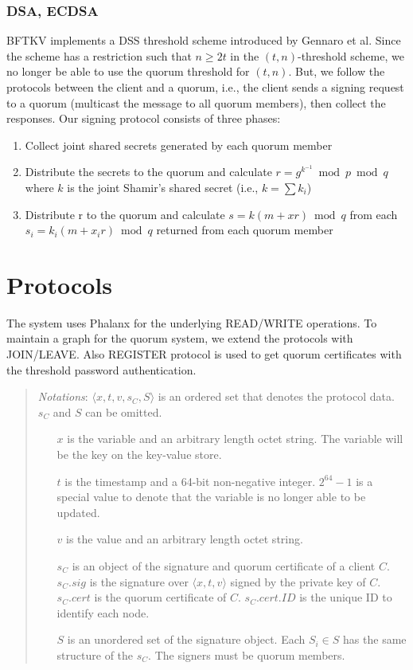 \documentclass[twoside,twocolumn,10pt,fleqn]{article}
\begin{document}
\subsubsection*{DSA, ECDSA}
BFTKV implements a DSS threshold scheme introduced by Gennaro et al. \cite{Gennaro}
Since the scheme has a restriction such that $n \geq 2t$ in the $(t,
n)$-threshold scheme, we no longer be able to use the quorum threshold
for $(t, n)$. But, we follow the protocols between the client and a
quorum, i.e., the client sends a signing request to a quorum
(multicast the message to all quorum members), then collect the
responses. Our signing protocol consists of three phases:
\begin{enumerate}
\item Collect joint shared secrets generated by each quorum member
\item Distribute the secrets to the quorum and calculate
  $r=g^{k^{-1}} \bmod p \bmod q$ where $k$ is the
  joint Shamir's shared secret (i.e., $k = \sum k_i$)
\item Distribute r to the quorum and calculate $s=k(m+xr) \bmod q$
  from each $s_i=k_i(m+x_ir) \bmod q$ returned from each quorum member
\end{enumerate}

\section{Protocols}

The system uses Phalanx \cite{Delhi:2} for the underlying READ/WRITE
operations. To maintain a graph for the quorum system, we extend the
protocols with JOIN/LEAVE. Also REGISTER protocol is used to get
quorum certificates with the threshold password authentication.

\begin{quote}
  {\em Notations}:
  $\langle x, t, v, s_C, S \rangle$ is an ordered set that denotes the protocol
  data. $s_C$ and $S$ can be omitted.
  \begin{itemize}
  \item[$x$] is the variable and an arbitrary length octet string. The variable will
    be the key on the key-value store.
  \item[$t$] is the timestamp and a 64-bit non-negative integer. $2^{64}-1$ is
    a special value to denote that the variable is no longer able to be
    updated.
  \item[$v$] is the value and an arbitrary length octet string.
  \item[$s_C$] is an object of the signature and quorum certificate of a
    client $C$. $s_C.sig$ is the signature over $\langle x, t, v \rangle$ signed by the
    private key of $C$. $s_C.cert$ is the quorum certificate of
    $C$. $s_C.cert.ID$ is the unique ID to identify each node.
  \item[$S$] is an unordered set of the signature object. Each $S_i
    \in S$ has the
    same structure of the $s_C$. The signers must be quorum members.
  \end{itemize}
\end{quote}
\end{document}
